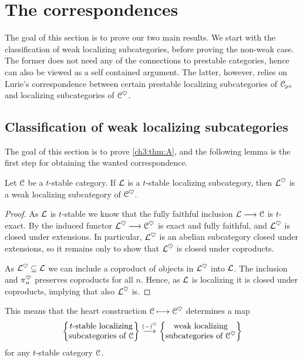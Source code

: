 

\section{The correspondences}

The goal of this section is to prove our two main results. We start with the classification of weak localizing subcategories, before proving the non-weak case. The former does not need any of the connections to prestable categories, hence can also be viewed as a self contained argument. The latter, however, relies on Lurie's correspondence between certain prestable localizing subcategories of $\EuScript{C}_{\hspace{-1pt}\scriptscriptstyle\geqslant 0}$ and localizing subcategories of $\EuScript{C}^\heartsuit$. 


\subsection{Classification of weak localizing subcategories}
\label{ch3:ssec:classificartion-weak-localizing}

The goal of this section is to prove \cref{ch3:thm:A}, and the following lemma is the first step for obtaining the wanted correspondence. 

\begin{lemma}
    \label{ch3:lm:t-stable-then-weak-localizing-heart}
    Let $\EuScript{C}$ be a $t$-stable category. If $\mathcal{L}$ is a $t$-stable localizing subcategory, then $\mathcal{L}^\heartsuit$ is a weak localizing subcategory of $\EuScript{C}^\heartsuit$. 
\end{lemma}
\begin{proof}
    As $\mathcal{L}$ is $t$-stable we know that the fully faithful inclusion $\mathcal{L}\longrightarrow \EuScript{C}$ is $t$-exact. By \cite[2.19]{antieau-gepner-heller_2019} the induced functor $\mathcal{L}^\heartsuit\longrightarrow\EuScript{C}^\heartsuit$ is exact and fully faithful, and $\mathcal{L}^\heartsuit$ is closed under extensions. In particular, $\mathcal{L}^\heartsuit$ is an abelian subcategory closed under extensions, so it remains only to show that $\mathcal{L}^\heartsuit$ is closed under coproducts.

    As $\mathcal{L}^\heartsuit \subseteq \mathcal{L}$ we can include a coproduct of objects in $\mathcal{L}^\heartsuit$ into $\mathcal{L}$. The inclusion and $\pi_n^\heartsuit$ preserves coproducts for all $n$. Hence, as $\mathcal{L}$ is localizing it is closed under coproducts, implying that also $\mathcal{L}^\heartsuit$ is. 
\end{proof}

This means that the heart construction $\EuScript{C} \longmapsto \EuScript{C}^\heartsuit$ determines a map
\[\left\{ \begin{matrix} t\text{-stable localizing}\\ \text{subcategories of }\EuScript{C} \end{matrix} \right\}\overset{(-)^\heartsuit}{\longrightarrow} \left\{ \begin{matrix} \text{weak localizing}\\ \text{subcategories of }\EuScript{C}^\heartsuit \end{matrix} \right\}\] 
for any $t$-stable category $\EuScript{C}$. 

